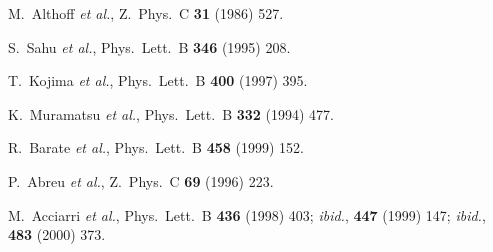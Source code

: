 \documentclass[aps,prl,twocolumn,groupedaddress]{revtex4}
\begin{document}
\begin{thebibliography}{1}
M.~Althoff {\it et al.}, %
Z.\ Phys.\ C {\bf 31} (1986) 527.


S.~Sahu {\it et al.}, %
Phys.\ Lett.\ B {\bf 346} (1995) 208.

T.~Kojima {\it et al.}, %
Phys.\ Lett.\ B {\bf 400} (1997) 395.

K.~Muramatsu {\it et al.}, %
Phys.\ Lett.\ B {\bf 332} (1994) 477.


R.~Barate {\it et al.}, %
Phys.\ Lett.\ B {\bf 458} (1999) 152.

P.~Abreu {\it et al.}, %
Z.\ Phys.\ C {\bf 69} (1996) 223.

M.~Acciarri {\it et al.}, %
Phys.\ Lett.\ B {\bf 436} (1998) 403;
{\it ibid.},
{\bf 447} (1999) 147;
{\it ibid.}, 
{\bf 483} (2000) 373.


\end{thebibliography}
\end{document}
